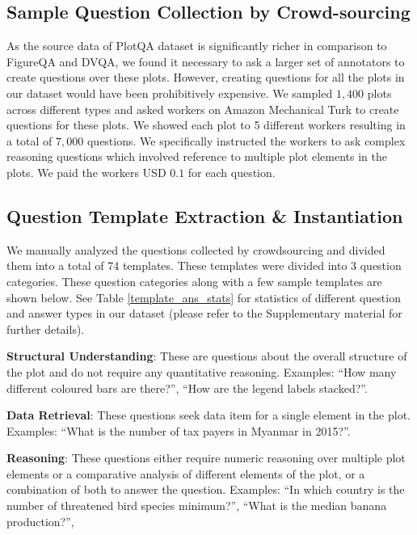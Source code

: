\documentclass[10pt,twocolumn,letterpaper]{article}
\begin{document}
\subsection{Sample Question Collection by Crowd-sourcing}
As the source data of PlotQA dataset is significantly richer in comparison to FigureQA and DVQA, we found it necessary to ask a larger set of annotators to create questions over these plots. 
However, creating questions for all the plots in our dataset would have been prohibitively expensive. 
We sampled $1,400$ plots across different types and asked workers on Amazon Mechanical Turk to create questions for these plots. 
We showed each plot to 5 different workers resulting in a total of $7,000$ questions. 
We specifically instructed the workers to ask complex reasoning questions which involved reference to multiple plot elements in the plots. 
We paid the workers USD $0.1$ for each question.




\subsection{Question Template Extraction \& Instantiation}

We manually analyzed the questions collected by crowdsourcing and divided them into a total of 74 templates. These templates were divided into 3 question categories. 
These question categories along with a few sample templates are shown below. See Table \ref{template_ans_stats} for statistics of different question and answer types in our dataset (please refer to the Supplementary material for further details).

\noindent\textbf{Structural Understanding}: 
    These are questions about the overall structure of the plot and do not require any quantitative reasoning. 
    Examples: ``How many different coloured bars are there?'', ``How are the legend labels stacked?''.

\noindent\textbf{Data Retrieval}:
    These questions seek data item for a single element in the plot.
    Examples: ``What is the number of tax payers in Myanmar in 2015?''.

\noindent\textbf{Reasoning}: 
    These questions either require numeric reasoning over multiple plot elements or a comparative analysis of different elements of the plot, or a combination of both to answer the question. 
    Examples: 
``In which country is the number of threatened bird species minimum?'', 
    ``What is the median banana production?'', 
\end{document}
